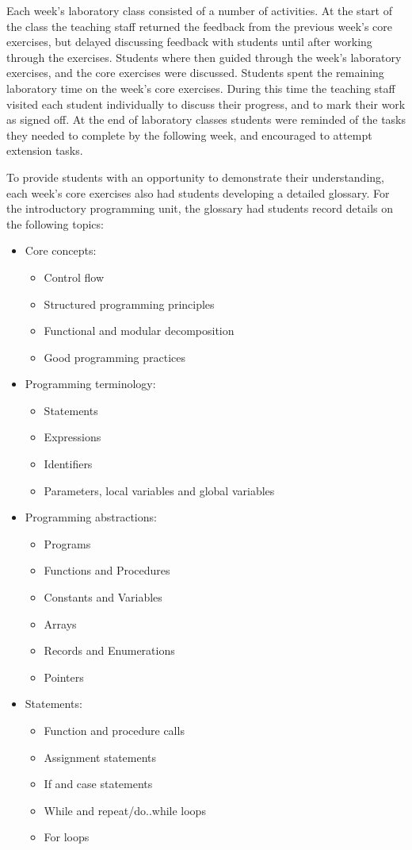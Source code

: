 Each week's laboratory class consisted of a number of activities. At the start of the class the teaching staff returned the feedback from the previous week's core exercises, but delayed discussing feedback with students until after working through the exercises. Students where then guided through the week's laboratory exercises, and the core exercises were discussed. Students spent the remaining laboratory time on the week's core exercises. During this time the teaching staff visited each student individually to discuss their progress, and to mark their work as signed off. At the end of laboratory classes students were reminded of the tasks they needed to complete by the following week, and encouraged to attempt extension tasks.

To provide students with an opportunity to demonstrate their understanding, each week's core exercises also had students developing a detailed glossary. For the introductory programming unit, the glossary had students record details on the following topics:
\begin{itemize}[noitemsep, nolistsep]
	\item Core concepts:
	\begin{itemize}[noitemsep, nolistsep]
		\item Control flow
		\item Structured programming principles
		\item Functional and modular decomposition
		\item Good programming practices
	\end{itemize}
	\item Programming terminology:
	\begin{itemize}[noitemsep, nolistsep]
		\item Statements
		\item Expressions
		\item Identifiers
		\item Parameters, local variables and global variables
	\end{itemize}
	\item Programming abstractions:
	\begin{itemize}[noitemsep, nolistsep]
		\item Programs
		\item Functions and Procedures
		\item Constants and Variables
		\item Arrays
		\item Records and Enumerations
		\item Pointers
	\end{itemize}
	\item Statements:
	\begin{itemize}[noitemsep, nolistsep]
		\item Function and procedure calls
		\item Assignment statements
		\item If and case statements
		\item While and repeat/do..while loops
		\item For loops
	\end{itemize}
\end{itemize}

